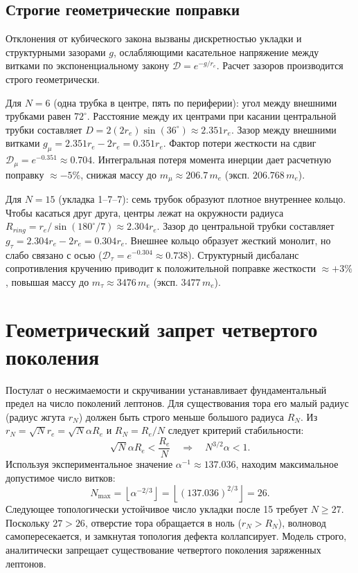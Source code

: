 \documentclass[12pt,a4paper]{article}
\begin{document}
\subsection{Строгие геометрические поправки}
Отклонения от кубического закона вызваны дискретностью укладки и структурными зазорами $g$, ослабляющими касательное напряжение между витками по экспоненциальному закону $\mathcal{D} = e^{-g/r_e}$. Расчет зазоров производится строго геометрически.

Для $N=6$ (одна трубка в центре, пять по периферии): угол между внешними трубками равен $72^\circ$. Расстояние между их центрами при касании центральной трубки составляет $D = 2(2r_e)\sin(36^\circ) \approx 2.351 r_e$. Зазор между внешними витками $g_\mu = 2.351 r_e - 2 r_e = 0.351 r_e$. Фактор потери жесткости на сдвиг $\mathcal{D}_\mu = e^{-0.351} \approx 0.704$. Интегральная потеря момента инерции дает расчетную поправку $\approx -5\%$, снижая массу до $m_\mu \approx 206.7\,m_e$ (эксп. $206.768\,m_e$).

Для $N=15$ (укладка 1--7--7): семь трубок образуют плотное внутреннее кольцо. Чтобы касаться друг друга, центры лежат на окружности радиуса $R_{ring} = r_e / \sin(180^\circ/7) \approx 2.304 r_e$. Зазор до центральной трубки составляет $g_\tau = 2.304 r_e - 2 r_e = 0.304 r_e$. Внешнее кольцо образует жесткий монолит, но слабо связано с осью ($\mathcal{D}_\tau = e^{-0.304} \approx 0.738$). Структурный дисбаланс сопротивления кручению приводит к положительной поправке жесткости $\approx +3\%$, повышая массу до $m_\tau \approx 3476\,m_e$ (эксп. $3477\,m_e$).

\section{Геометрический запрет четвертого поколения}

Постулат о несжимаемости и скручивании устанавливает фундаментальный предел на число поколений лептонов. Для существования тора его малый радиус (радиус жгута $r_N$) должен быть строго меньше большого радиуса $R_N$. Из $r_N = \sqrt{N} r_e = \sqrt{N} \alpha R_e$ и $R_N = R_e / N$ следует критерий стабильности:
\begin{equation}
\sqrt{N} \alpha R_e < \frac{R_e}{N} \quad \Longrightarrow \quad N^{3/2} \alpha < 1.
\label{eq:collapse_condition}
\end{equation}
Используя экспериментальное значение $\alpha^{-1} \approx 137.036$, находим максимальное допустимое число витков:
\begin{equation}
N_{\text{max}} = \left\lfloor \alpha^{-2/3} \right\rfloor = \left\lfloor (137.036)^{2/3} \right\rfloor = 26.
\end{equation}
Следующее топологически устойчивое число укладки после 15 требует $N \ge 27$. Поскольку $27 > 26$, отверстие тора обращается в ноль ($r_N > R_N$), волновод самопересекается, и замкнутая топология дефекта коллапсирует. Модель строго, аналитически запрещает существование четвертого поколения заряженных лептонов.
\end{document}
